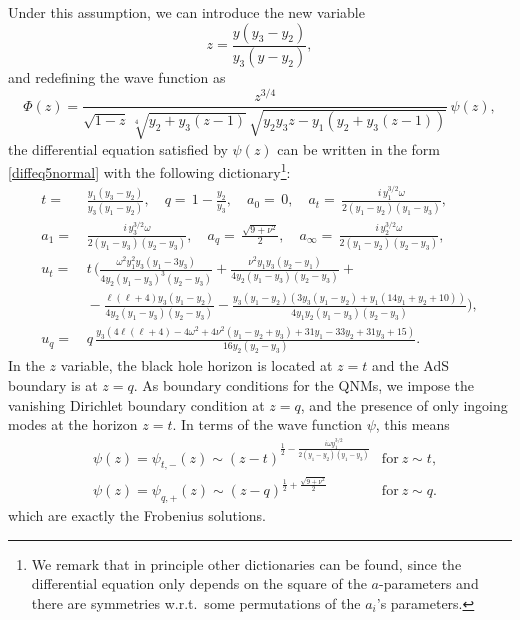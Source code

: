 \documentclass[11pt]{article}
\numberwithin{equation}{section}
\begin{document}
Under this assumption, we can introduce the new variable 
\begin{equation}
z=\frac{y(y_3-y_2)}{y_3(y-y_2)},
\end{equation}
and redefining the wave function as
\begin{equation}
\Phi(z)=\frac{z^{3/4}}{\sqrt{1-z}\, \sqrt[4]{y_2+y_3 (z-1)}\, \sqrt{y_2 y_3 z-y_1 (y_2+y_3 (z-1))}}\,\psi(z),
\end{equation}
the differential equation satisfied by $\psi(z)$ can be written in the form \eqref{diffeq5normal} with the following dictionary\footnote{We remark that in principle other dictionaries can be found, since the differential equation only depends on the square of the $a$-parameters and there are symmetries w.r.t.~some permutations of the $a_i$'s parameters.}:
\begin{equation}\label{theoryparameter}
\begin{aligned}
t=&\,\frac{y_1 (y_3-y_2)}{y_3(y_1-y_2)},\quad
q=\,1-\frac{y_2}{y_3},\quad
a_0=\,0,\quad
a_t=\,\frac{i\,y_1^{3/2}\omega}{2(y_1-y_2)(y_1-y_3)},\\
a_1=&\,\frac{i\,y_3^{3/2}\omega}{2(y_1-y_3)(y_2-y_3)},\quad
a_{q}=\,\frac{\sqrt{9+\nu^2}}{2},\quad
a_{\infty}=\,\frac{i\,y_2^{3/2}\omega}{2(y_1-y_2)(y_2-y_3)},\\
u_t=&\,t\,\Bigg(\frac{\omega ^2 y_1^2 y_3 (y_1-3 y_3)}{4 y_2 (y_1-y_3)^3 (y_2-y_3)}+\frac{\nu ^2 y_1 y_3 (y_2-y_1)}{4 y_2 (y_1-y_3) (y_2-y_3)}+\\
&\,-\frac{\ell (\ell+4) y_3 (y_1-y_2)}{4 y_2 (y_1-y_3) (y_2-y_3)}-\frac{y_3 (y_1-y_2) (3 y_3 (y_1-y_2)+y_1 (14 y_1+y_2+10))}{4 y_1 y_2 (y_1-y_3) (y_2-y_3)}\Bigg),\\
u_{q}=&\,q\,\frac{y_3 \left(4 \ell (\ell+4)-4 \omega ^2+4 \nu ^2 (y_1-y_2+y_3)+31 y_1-33 y_2+31 y_3+15\right)}{16 y_2 (y_2-y_3)}.
\end{aligned}
\end{equation}
%
%
In the $z$ variable, the black hole horizon is located at $z=t$ and the AdS boundary is at $z=q$. 
As boundary conditions for the QNMs, we impose the vanishing Dirichlet boundary condition at $z=q$, and the presence of only ingoing modes at the horizon $z=t$. In terms of the wave function $\psi$, this means 
\begin{equation}\label{bcAdS7}
\begin{aligned}
&\psi(z)=\psi_{t,-}(z)\sim (z-t)^{\frac{1}{2}-\frac{i\omega y_1^{3/2}}{2(y_1-y_2)(y_1-y_3)}} &\text{for}\ z\sim t,\\
&\psi(z)=\psi_{q,+}(z)\sim (z-q)^{\frac{1}{2}+\frac{\sqrt{9+\nu^2}}{2}} &\text{for}\ z\sim q.
\end{aligned}
\end{equation}
which are exactly the Frobenius solutions.
\end{document}
